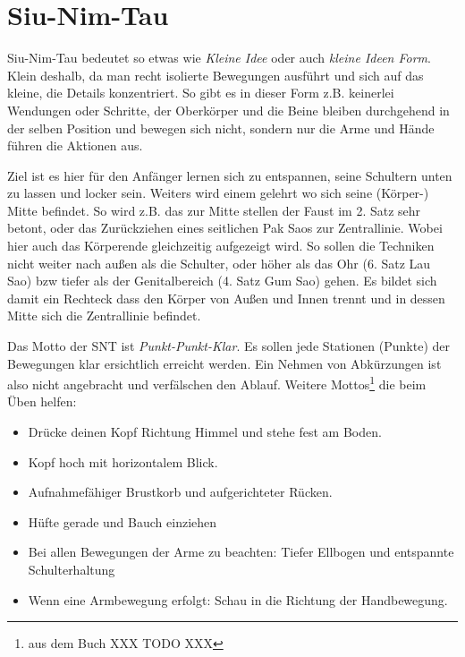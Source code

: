\section{Siu-Nim-Tau}


Siu-Nim-Tau bedeutet so etwas wie \textit{Kleine Idee} oder auch \textit{kleine Ideen Form}. Klein deshalb, da man recht isolierte Bewegungen ausf\"uhrt und sich auf das kleine, die Details konzentriert. So gibt es in dieser Form z.B. keinerlei Wendungen oder Schritte, der Oberk\"orper und die Beine bleiben durchgehend in der selben Position und bewegen sich nicht, sondern nur die Arme und H\"ande f\"uhren die Aktionen aus.

Ziel ist es hier f\"ur den Anf\"anger lernen sich zu entspannen, seine Schultern unten zu lassen und locker sein. Weiters wird einem gelehrt wo sich seine (K\"orper-) Mitte befindet. So wird z.B. das zur Mitte stellen der Faust im 2. Satz sehr betont, oder das Zur\"uckziehen eines seitlichen Pak Saos zur Zentrallinie. Wobei hier auch das K\"orperende gleichzeitig aufgezeigt wird. So sollen die Techniken nicht weiter nach au{\ss}en als die Schulter, oder h\"oher als das Ohr (6. Satz Lau Sao) bzw tiefer als der Genitalbereich (4. Satz Gum Sao) gehen. Es bildet sich damit ein Rechteck dass den K\"orper von Au{\ss}en und Innen trennt und in dessen Mitte sich die Zentrallinie befindet.

Das Motto der SNT ist \textit{Punkt-Punkt-Klar}. Es sollen jede Stationen (Punkte) der Bewegungen klar ersichtlich erreicht werden. Ein Nehmen von Abk\"urzungen ist also nicht angebracht und verf\"alschen den Ablauf. Weitere Mottos\footnote{aus dem Buch XXX TODO XXX} die beim \"Uben helfen:

\begin{itemize}
	\item Dr\"ucke deinen Kopf Richtung Himmel und stehe fest am Boden.
	\item Kopf hoch mit horizontalem Blick.
	\item Aufnahmef\"ahiger Brustkorb und aufgerichteter R\"ucken.
	\item H\"ufte gerade und Bauch einziehen
	\item Bei allen Bewegungen der Arme zu beachten: Tiefer Ellbogen und entspannte Schulterhaltung
	\item Wenn eine Armbewegung erfolgt: Schau in die Richtung der Handbewegung.
\end{itemize}




